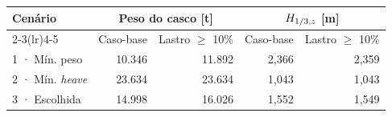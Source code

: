 \begin{tabular}{lrrrr}
\toprule
Cenário & \multicolumn{2}{c}{Peso do casco [t]} & \multicolumn{2}{c}{$H_{1/3,z}$ [m]} \\
\cmidrule(lr){2-3}\cmidrule(lr){4-5}
 & Caso-base & Lastro $\ge$ 10\% & Caso-base & Lastro $\ge$ 10\% \\
\midrule
1 · Mín. peso & 10.346 & 11.892 & 2,366 & 2,359 \\
2 · Mín. \emph{heave} & 23.634 & 23.634 & 1,043 & 1,043 \\
3 · Escolhida & 14.998 & 16.026 & 1,552 & 1,549 \\
\bottomrule
\end{tabular}
